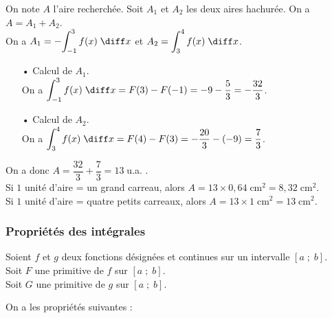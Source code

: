 On note $A$ l'aire recherchée. Soit $A_1$ et $A_2$ les deux aires hachurée. On a $A = A_1 + A_2$. \\

On a $A_1 = -\displaystyle{\int_{-1}^3 f(x) \; \diff x}$ et $A_2 = \displaystyle{\int_3^4 f(x) \; \diff x}$. \\

\begin{itemize}
\item[•] Calcul de $A_1$. \\

On a $\displaystyle{\int_{-1}^3 f(x) \; \diff x} = F(3) - F(-1) = -9 - \dfrac{5}{3} = -\dfrac{32}{3}$. \\

\item[•] Calcul de $A_2$. \\

On a $\displaystyle{\int_3^4 f(x) \; \diff x} = F(4) - F(3) = -\dfrac{20}{3} - \left(-9\right) = \dfrac{7}{3}$. \\
\end{itemize}

On a donc $A = \dfrac{32}{3} + \dfrac{7}{3} = 13 \; $u.a. . \\

Si $1$ unité d'aire = un grand carreau, alors $A = 13 \times 0,64 \; \mathrm{cm}^2 = 8,32 \; \mathrm{cm}^2$. \\

Si $1$ unité d'aire = quatre petits carreaux, alors $A = 13 \times 1 \; \mathrm{cm}^2 = 13 \; \mathrm{cm}^2$. 

\vspace*{-5cm}

\newpage

\vspace*{-2.3cm}

\subsubsection{Propriétés des intégrales}

Soient $f$ et $g$ deux fonctions désignées et continues sur un intervalle $\left[a \; ; \; b \right]$. \\
Soit $F$ une primitive de $f$ sur $\left[a \; ; \; b \right]$. \\
Soit $G$ une primitive de $g$ sur $\left[a \; ; \; b \right]$. 

\vspace*{.1cm}

On a les propriétés suivantes : \\

